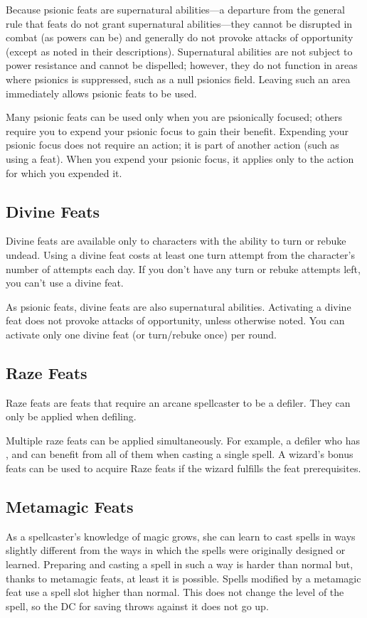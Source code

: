 Because psionic feats are supernatural abilities---a departure from the general rule that feats do not grant supernatural abilities---they cannot be disrupted in combat (as powers can be) and generally do not provoke attacks of opportunity (except as noted in their descriptions). Supernatural abilities are not subject to power resistance and cannot be dispelled; however, they do not function in areas where psionics is suppressed, such as a null psionics field. Leaving such an area immediately allows psionic feats to be used.

Many psionic feats can be used only when you are psionically focused; others require you to expend your psionic focus to gain their benefit. Expending your psionic focus does not require an action; it is part of another action (such as using a feat). When you expend your psionic focus, it applies only to the action for which you expended it.

\subsection{Divine Feats}
Divine feats are available only to characters with the ability to turn or rebuke undead. Using a divine feat costs at least one turn attempt from the character's number of attempts each day. If you don't have any turn or rebuke attempts left, you can't use a divine feat.

As psionic feats, divine feats are also supernatural abilities. Activating a divine feat does not provoke attacks of opportunity, unless otherwise noted. You can activate only one divine feat (or turn/rebuke once) per round.

\subsection{Raze Feats}
Raze feats are feats that require an arcane spellcaster to be a defiler. They can only be applied when defiling.

Multiple raze feats can be applied simultaneously. For example, a defiler who has ,  and  can benefit from all of them when casting a single spell. A wizard's bonus feats can be used to acquire Raze feats if the wizard fulfills the feat prerequisites.

\subsection{Metamagic Feats}
As a spellcaster's knowledge of magic grows, she can learn to cast spells in ways slightly different from the ways in which the spells were originally designed or learned. Preparing and casting a spell in such a way is harder than normal but, thanks to metamagic feats, at least it is possible. Spells modified by a metamagic feat use a spell slot higher than normal. This does not change the level of the spell, so the DC for saving throws against it does not go up.


